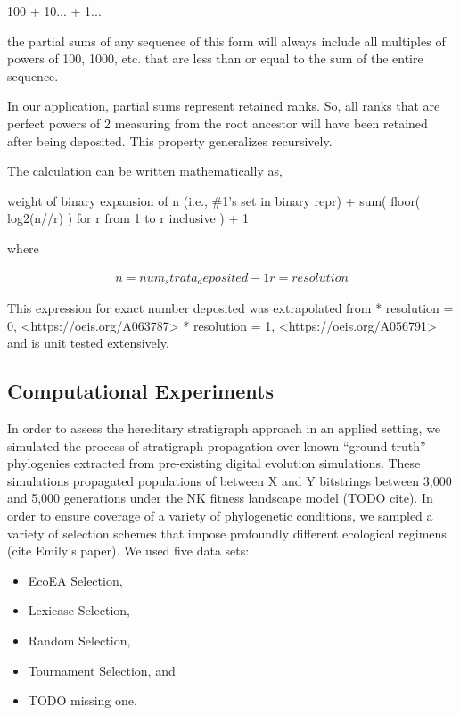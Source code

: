    100 + 10... + 1...

the partial sums of any sequence of this form will always include all
multiples of powers of 100, 1000, etc. that are less than or equal to
the sum of the entire sequence.

In our application, partial sums represent retained ranks. So, all
ranks that are perfect powers of 2 measuring from the root ancestor
will have been retained after being deposited. This property
generalizes recursively.

The calculation can be written mathematically as,

  weight of binary expansion of n (i.e., \#1's set in binary repr)
  + sum(
      floor( log2(n//r) )
      for r from 1 to r inclusive
  )
  + 1

where

\begin{align*}
  n = num_strata_deposited - 1
  r = resolution
\end{align*}

This expression for exact number deposited was extrapolated from
    * resolution = 0, <https://oeis.org/A063787> \citep{sloane2021a063787}
    * resolution = 1, <https://oeis.org/A056791> \citep{sloane2021a056791}
and is unit tested extensively.

\subsection{Computational Experiments}

In order to assess the hereditary stratigraph approach in an applied setting, we simulated the process of stratigraph propagation over known ``ground truth'' phylogenies extracted from pre-existing digital evolution simulations.
These simulations propagated populations of between X and Y bitstrings between 3,000 and 5,000 generations under the NK fitness landscape model (TODO cite).
In order to ensure coverage of a variety of phylogenetic conditions, we sampled a variety of selection schemes that impose profoundly different ecological regimens (cite Emily's paper).
We used five data sets:
\begin{itemize}
  \item EcoEA Selection,
  \item Lexicase Selection,
  \item Random Selection,
  \item Tournament Selection, and
  \item TODO missing one.
\end{itemize}

